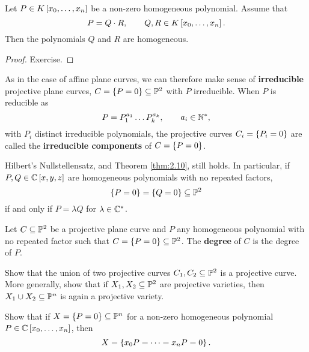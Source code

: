 \begin{lemma}
\label{lem:4.10}
Let $ P \in K\sbr{x_0, \dots, x_n} $ be a non-zero homogeneous polynomial. Assume that
$$ P = Q \cdot R, \qquad Q, R \in K\sbr{x_0, \dots, x_n}. $$
Then the polynomials $ Q $ and $ R $ are homogeneous.
\end{lemma}

\begin{proof}
Exercise.
\end{proof}

\begin{remark}
As in the case of affine plane curves, we can therefore make sense of \textbf{irreducible} projective plane curves, $ C = \cbr{P = 0} \subseteq \P^2 $ with $ P $ irreducible. When $ P $ is reducible as
$$ P = P_1^{a_1} \dots P_k^{a_k}, \qquad a_i \in \N^*, $$
with $ P_i $ distinct irreducible polynomials, the projective curves $ C_i = \cbr{P_i = 0} $ are called the \textbf{irreducible components} of $ C = \cbr{P = 0} $.
\end{remark}

\begin{remark}
\label{rem:4.12}
Hilbert's Nullstellensatz, and Theorem \ref{thm:2.10}, still holds. In particular, if $ P, Q \in \C\sbr{x, y, z} $ are homogeneous polynomials with no repeated factors,
$$ \cbr{P = 0} = \cbr{Q = 0} \subseteq \P^2 $$
if and only if $ P = \lambda Q $ for $ \lambda \in \C^* $.
\end{remark}

\begin{definition}
Let $ C \subseteq \P^2 $ be a projective plane curve and $ P $ any homogeneous polynomial with no repeated factor such that $ C = \cbr{P = 0} \subseteq \P^2 $. The \textbf{degree} of $ C $ is the degree of $ P $.
\end{definition}

\begin{exercise}
Show that the union of two projective curves $ C_1, C_2 \subseteq \P^2 $ is a projective curve. More generally, show that if $ X_1, X_2 \subseteq \P^2 $ are projective varieties, then $ X_1 \cup X_2 \subseteq \P^n $ is again a projective variety.
\end{exercise}

\begin{exercise}
Show that if $ X = \cbr{P = 0} \subseteq \P^n $ for a non-zero homogeneous polynomial $ P \in \C\sbr{x_0, \dots, x_n} $, then
$$ X = \cbr{x_0P = \dots = x_nP = 0}. $$
\end{exercise}

